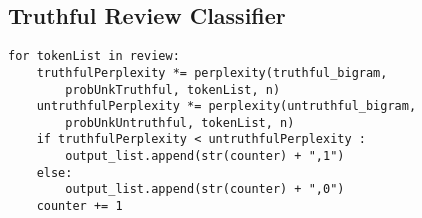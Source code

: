 \documentclass[11pt]{article}
\begin{document}
\subsection{Truthful Review Classifier}
\begin{lstlisting}[frame=single]
for tokenList in review:
    truthfulPerplexity *= perplexity(truthful_bigram,
        probUnkTruthful, tokenList, n)
    untruthfulPerplexity *= perplexity(untruthful_bigram,
        probUnkUntruthful, tokenList, n)
    if truthfulPerplexity < untruthfulPerplexity :
        output_list.append(str(counter) + ",1")
    else:
        output_list.append(str(counter) + ",0")
    counter += 1
\end{lstlisting}
\end{document}
